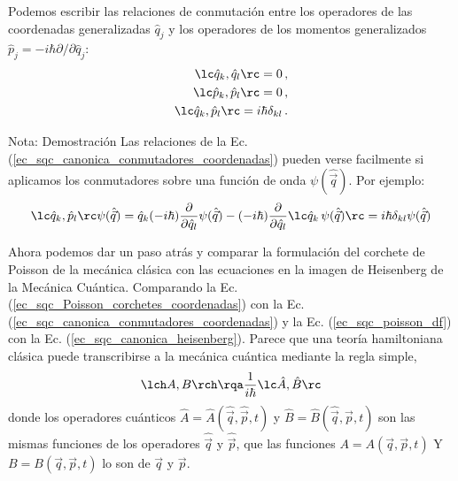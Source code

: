         Podemos escribir las relaciones de conmutación entre los operadores de las coordenadas generalizadas $\hat{q}_j$ y los operadores de los momentos generalizados $\hat{p}_j = -i \hbar \partial/\partial \hat{q}_j $:
        \begin{equation} \label{ec_sqc_canonica_conmutadores_coordenadas}
            \begin{aligned}
                \lc \hat{q}_k, \hat{q}_l \rc = 0\,, \\
                \lc \hat{p}_k, \hat{p}_l \rc = 0\,, \\
                \lc \hat{q}_k, \hat{p}_l \rc = i \hbar \delta_{kl} \,.
            \end{aligned}
        \end{equation}

        \begin{mybox_blue}{Nota: Demostración}
            Las relaciones de la Ec. (\ref{ec_sqc_canonica_conmutadores_coordenadas}) pueden verse facilmente si aplicamos los conmutadores sobre una función de onda $\psi(\hat{\vec{q}})$. Por ejemplo:
            \begin{equation}
                \lc \hat{q}_k, \hat{p}_l \rc \psi (\hat{\vec{q}}) = \hat{q}_k (-i\hbar) \frac{\partial}{\partial \hat{q}_l} \psi(\hat{\vec{q}}) - (-i\hbar) \frac{\partial}{\partial \hat{q}_l} \lc \hat{q}_k \, \psi(\hat{\vec{q}}) \rc = i \hbar \delta_{kl} \psi (\hat{\vec{q}})
            \end{equation}
            
        \end{mybox_blue}





        Ahora podemos dar un paso atrás y comparar la formulación del corchete de Poisson de la mecánica clásica con las ecuaciones en la imagen de Heisenberg de la Mecánica Cuántica. Comparando la Ec. (\ref{ec_sqc_Poisson_corchetes_coordenadas}) con la Ec. (\ref{ec_sqc_canonica_conmutadores_coordenadas}) y la Ec. (\ref{ec_sqc_poisson_df})  con la Ec. (\ref{ec_sqc_canonica_heisenberg}). Parece que una teoría hamiltoniana clásica puede transcribirse a la mecánica cuántica mediante la regla simple,
        \begin{equation} \label{ec_scq_cuantizacion_canonica}
            \lch A, B \rch \rqa \frac{1}{i \hbar} \lc \hat{A} , \hat{B} \rc
        \end{equation}
        donde los operadores cuánticos $\hat{A} = \hat{A}(\hat{\vec{q}}, \hat{\vec{p}},t)$ y $\hat{B} = \hat{B}(\hat{\vec{q}}, \hat{\vec{p}},t)$ son las mismas funciones de los operadores $\hat{\vec{q}}$ y $\hat{\vec{p}}$, que las funciones $A = A(\vec{q}, \vec{p}, t)$ Y $B = B(\vec{q}, \vec{p}, t)$ lo son de $\vec{q}$ y $\vec{p}$.

